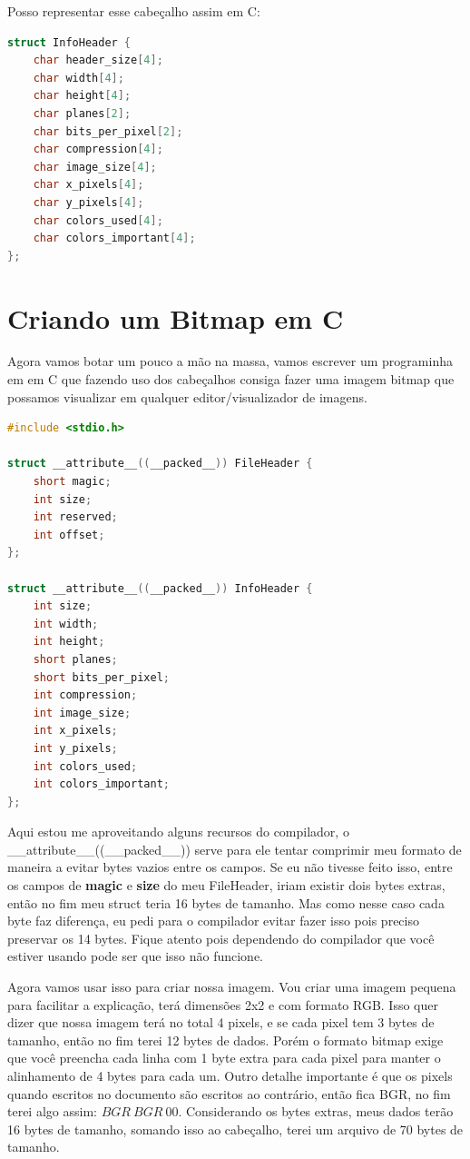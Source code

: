 \documentclass[a4paper,oneside,12pt]{article}
\begin{document}
Posso representar esse cabeçalho assim em C:
\begin{lstlisting}[language=C, caption=Cabeçalho de Informação em C]
struct InfoHeader {
    char header_size[4];
    char width[4];
    char height[4];
    char planes[2];
    char bits_per_pixel[2];
    char compression[4];
    char image_size[4];
    char x_pixels[4];
    char y_pixels[4];
    char colors_used[4];
    char colors_important[4];
};
\end{lstlisting}

\section{Criando um Bitmap em C}

Agora vamos botar um pouco a mão na massa, vamos escrever um programinha em em C que fazendo uso dos cabeçalhos consiga fazer uma imagem bitmap que possamos visualizar em qualquer editor/visualizador de imagens.
\newpage

\begin{lstlisting}[language=C, caption=Cabeçalhos]
#include <stdio.h>

struct __attribute__((__packed__)) FileHeader {
    short magic;
    int size;
    int reserved;
    int offset;
};

struct __attribute__((__packed__)) InfoHeader {
    int size;
    int width;
    int height;
    short planes;
    short bits_per_pixel;
    int compression;
    int image_size;
    int x_pixels;
    int y_pixels;
    int colors_used;
    int colors_important;
};
\end{lstlisting}

Aqui estou me aproveitando alguns recursos do compilador, o\\ \_\_attribute\_\_((\_\_packed\_\_))  serve para ele tentar comprimir meu formato de maneira a evitar bytes vazios entre os campos.
Se eu não tivesse feito isso, entre os campos de \textbf{magic} e \textbf{size} do meu FileHeader, iriam existir dois bytes extras, então no fim meu struct teria 16 bytes de tamanho. Mas como nesse caso cada byte faz diferença, eu pedi para o compilador evitar fazer isso pois preciso preservar os 14 bytes.
Fique atento pois dependendo do compilador que você estiver usando pode ser que isso não funcione.

Agora vamos usar isso para criar nossa imagem. Vou criar uma imagem pequena para facilitar a explicação, terá dimensões 2x2 e com formato RGB.
Isso quer dizer que nossa imagem terá no total 4 pixels, e se cada pixel tem 3 bytes de tamanho, então no fim terei 12 bytes de dados. Porém o formato bitmap exige que você preencha cada linha com 1 byte extra para cada pixel para manter o alinhamento de 4 bytes para cada um. Outro detalhe importante é que os pixels quando escritos no documento são escritos ao contrário, então fica BGR, no fim terei algo assim: $BGR\ BGR\ 0 0$. Considerando os bytes extras, meus dados terão 16 bytes de tamanho, somando isso ao cabeçalho, terei um arquivo de 70 bytes de tamanho.
\end{document}
